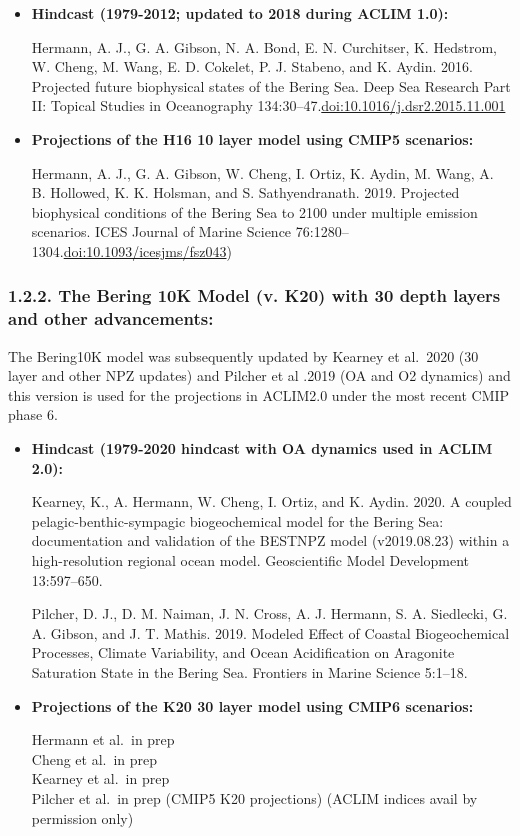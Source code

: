 \documentclass[
]{article}
\begin{document}
\begin{itemize}
\item
  \textbf{Hindcast (1979-2012; updated to 2018 during ACLIM 1.0):}

  Hermann, A. J., G. A. Gibson, N. A. Bond, E. N. Curchitser, K.
  Hedstrom, W. Cheng, M. Wang, E. D. Cokelet, P. J. Stabeno, and K.
  Aydin. 2016. Projected future biophysical states of the Bering Sea.
  Deep Sea Research Part II: Topical Studies in Oceanography
  134:30--47.\href{http://dx.doi.org/10.1016/j.dsr2.2015.11.001}{doi:10.1016/j.dsr2.2015.11.001}
\item
  \textbf{Projections of the H16 10 layer model using CMIP5 scenarios:}

  Hermann, A. J., G. A. Gibson, W. Cheng, I. Ortiz, K. Aydin, M. Wang,
  A. B. Hollowed, K. K. Holsman, and S. Sathyendranath. 2019. Projected
  biophysical conditions of the Bering Sea to 2100 under multiple
  emission scenarios. ICES Journal of Marine Science
  76:1280--1304.\href{https://academic.oup.com/icesjms/article/76/5/1280/5477847?login=true}{doi:10.1093/icesjms/fsz043})
\end{itemize}

\hypertarget{the-bering-10k-model-v.-k20-with-30-depth-layers-and-other-advancements}{%
\subsubsection{1.2.2. The Bering 10K Model (v. K20) with 30 depth layers
and other
advancements:}\label{the-bering-10k-model-v.-k20-with-30-depth-layers-and-other-advancements}}

The Bering10K model was subsequently updated by Kearney et al.~2020 (30
layer and other NPZ updates) and Pilcher et al .2019 (OA and O2
dynamics) and this version is used for the projections in ACLIM2.0 under
the most recent CMIP phase 6.

\begin{itemize}
\item
  \textbf{Hindcast (1979-2020 hindcast with OA dynamics used in ACLIM
  2.0):}

  Kearney, K., A. Hermann, W. Cheng, I. Ortiz, and K. Aydin. 2020. A
  coupled pelagic-benthic-sympagic biogeochemical model for the Bering
  Sea: documentation and validation of the BESTNPZ model (v2019.08.23)
  within a high-resolution regional ocean model. Geoscientific Model
  Development 13:597--650.

  Pilcher, D. J., D. M. Naiman, J. N. Cross, A. J. Hermann, S. A.
  Siedlecki, G. A. Gibson, and J. T. Mathis. 2019. Modeled Effect of
  Coastal Biogeochemical Processes, Climate Variability, and Ocean
  Acidification on Aragonite Saturation State in the Bering Sea.
  Frontiers in Marine Science 5:1--18.
\item
  \textbf{Projections of the K20 30 layer model using CMIP6 scenarios:}

  Hermann et al.~in prep\\
  Cheng et al.~in prep\\
  Kearney et al.~in prep\\
  Pilcher et al.~in prep (CMIP5 K20 projections) (ACLIM indices avail by
  permission only)
\end{itemize}
\end{document}
